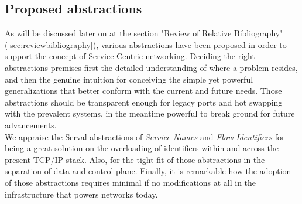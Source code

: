 \subsection{Proposed abstractions}
As will be discussed later on at the section "Review of Relative Bibliography" (\ref{sec:reviewbibliography}), various abstractions have been proposed in order to support the concept of Service-Centric networking.
Deciding the right abstractions premises first the detailed understanding of where a problem resides, and then the genuine intuition for conceiving the simple yet powerful generalizations that better conform with the current and future needs.
Those abstractions should be transparent enough for legacy ports and hot swapping with the prevalent systems, in the meantime powerful to break ground for future advancements.\\
\indent We appraise the Serval abstractions of \emph{Service Names} and \emph{Flow Identifiers} for being a great solution on the overloading of identifiers within and across the present TCP/IP stack.
Also, for the tight fit of those abstractions in the separation of data and control plane.
Finally, it is remarkable how the adoption of those abstractions requires minimal if no modifications at all in the infrastructure that powers networks today.



